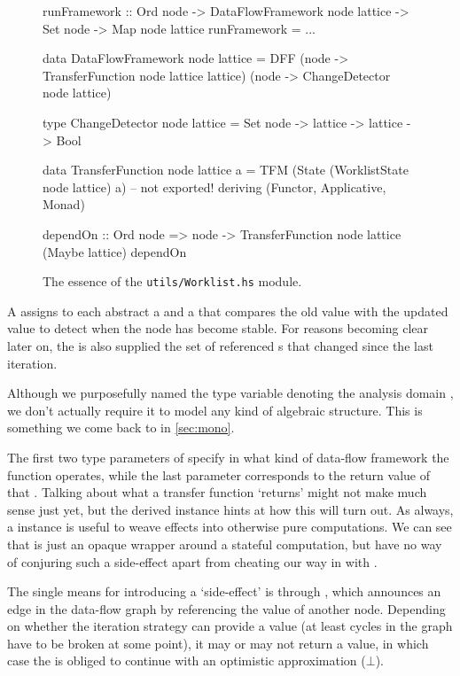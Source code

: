 \begin{figure}[h]
  \centering
  \begin{haskellcode}
    runFramework 
      :: Ord node
      -> DataFlowFramework node lattice 
      -> Set node 
      -> Map node lattice
    runFramework = ...

    data DataFlowFramework node lattice = DFF 
          (node -> TransferFunction node lattice lattice)
          (node -> ChangeDetector node lattice)

    type ChangeDetector node lattice
      = Set node -> lattice -> lattice -> Bool

    data TransferFunction node lattice a
      = TFM (State (WorklistState node lattice) a) -- not exported!
      deriving (Functor, Applicative, Monad)

    dependOn
      :: Ord node 
      => node 
      -> TransferFunction node lattice (Maybe lattice)
    dependOn
  \end{haskellcode}
  \caption{The essence of the \texttt{utils/Worklist.hs} module.}
  \label{fig:worklist}
\end{figure}

A  assigns to each abstract  a  and a  that compares the old value with the updated value to detect when the node has become stable. 
For reasons becoming clear later on, the  is also supplied the set of referenced s that changed since the last iteration.

Although we purposefully named the type variable denoting the analysis domain , we don't actually require it to model any kind of algebraic structure.
This is something we come back to in \cref{sec:mono}.

The first two type parameters of  specify in what kind of data-flow framework the function operates, while the last parameter corresponds to the return value of that .
Talking about what a transfer function `returns' might not make much sense just yet, but the derived  instance hints at how this will turn out.
As always, a  instance is useful to weave effects into otherwise pure computations. 
We can see that  is just an opaque wrapper around a stateful computation, but have no way of conjuring such a side-effect apart from cheating our way in with .

The single means for introducing a `side-effect' is through , which announces an edge in the data-flow graph by referencing the value of another node.
Depending on whether the iteration strategy can provide a value (at least cycles in the graph have to be broken at some point), it may or may not return a value, in which case the  is obliged to continue with an optimistic approximation (\eg $\bot$).

